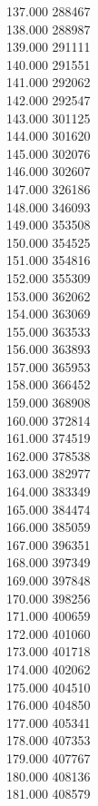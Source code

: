 { 137.000	288467 \\
 138.000	288987 \\
 139.000	291111 \\
 140.000	291551 \\
 141.000	292062 \\
 142.000	292547 \\
 143.000	301125 \\
 144.000	301620 \\
 145.000	302076 \\
 146.000	302607 \\
 147.000	326186 \\
 148.000	346093 \\
 149.000	353508 \\
 150.000	354525 \\
 151.000	354816 \\
 152.000	355309 \\
 153.000	362062 \\
 154.000	363069 \\
 155.000	363533 \\
 156.000	363893 \\
 157.000	365953 \\
 158.000	366452 \\
 159.000	368908 \\
 160.000	372814 \\
 161.000	374519 \\
 162.000	378538 \\
 163.000	382977 \\
 164.000	383349 \\
 165.000	384474 \\
 166.000	385059 \\
 167.000	396351 \\
 168.000	397349 \\
 169.000	397848 \\
 170.000	398256 \\
 171.000	400659 \\
 172.000	401060 \\
 173.000	401718 \\
 174.000	402062 \\
 175.000	404510 \\
 176.000	404850 \\
 177.000	405341 \\
 178.000	407353 \\
 179.000	407767 \\
 180.000	408136 \\
 181.000	408579 \\
}
